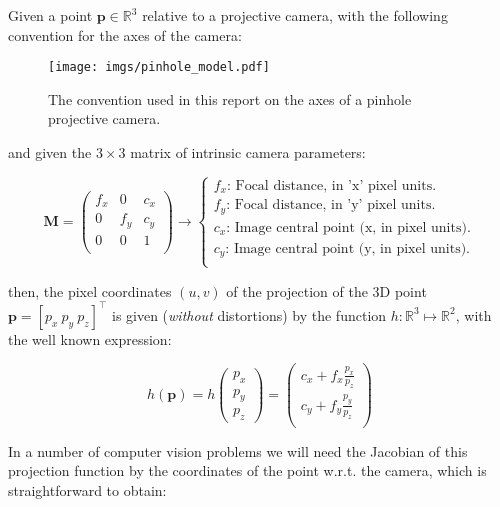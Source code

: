 \documentclass[a4paper,11pt]{report}
\begin{document}
Given a point $\mathbf{p} \in \mathbb{R}^3$ relative to a
projective camera, with the following convention for the axes of the
camera:

\begin{figure}[h!]
\centering
\texttt{[image: imgs/pinhole\_model.pdf]}
\caption{The convention used in this report on the axes of a pinhole projective camera.}
\label{fig:pinhole}
\end{figure}

\noindent and given the $3 \times 3$ matrix of intrinsic camera parameters:

\begin{equation}
\mathbf{M}=
\left(
\begin{array}{ccc}
 f_x & 0 & c_x \\
  0  & f_y & c_y \\
 0 & 0 & 1 \\
\end{array}
\right)
\longrightarrow
\left\{
\begin{array}{l}
 f_x\text{: Focal distance, in 'x' pixel units.} \\
 f_y\text{: Focal distance, in 'y' pixel units.} \\
 c_x\text{: Image central point (x, in pixel units).} \\
 c_y\text{: Image central point (y, in pixel units).} \\
\end{array}
\right.
\end{equation}


\noindent then, the pixel coordinates $(u,v)$ of the projection of the
3D point $\mathbf{p}=[p_x ~ p_y ~ p_z]^\top$
is given (\emph{without} distortions) by the function $h: \mathbb{R}^3 \mapsto \mathbb{R}^2$,
with the well known expression:

\begin{equation}
h(\mathbf{p}) =
h\left(
\begin{array}{c}
 p_x \\ p_y \\p_z
\end{array}
\right) =
\left(
\begin{array}{c}
 c_x + f_x  \frac{p_x}{p_z} \\
 c_y + f_y  \frac{p_y}{p_z} \\
\end{array}
\right)
\end{equation}

In a number of computer vision problems we will need the Jacobian of this
projection function by the coordinates of the point w.r.t. the camera, which
is straightforward to obtain:
\end{document}
